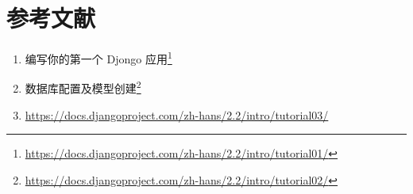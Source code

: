 \documentclass[]{ctexbook}
\providecommand{\tightlist}{%
  \setlength{\itemsep}{0pt}\setlength{\parskip}{0pt}}
\renewcommand{\href}[2]{#2\footnote{\url{#1}}}
\begin{document}
\hypertarget{ux53c2ux8003ux6587ux732e-1}{%
\section{参考文献}\label{ux53c2ux8003ux6587ux732e-1}}

\begin{enumerate}
\def\labelenumi{\arabic{enumi}.}
\tightlist
\item
  \href{https://docs.djangoproject.com/zh-hans/2.2/intro/tutorial01/}{编写你的第一个 Djongo 应用}
\item
  \href{https://docs.djangoproject.com/zh-hans/2.2/intro/tutorial02/}{数据库配置及模型创建}
\item
  \url{https://docs.djangoproject.com/zh-hans/2.2/intro/tutorial03/}
\end{enumerate}



\backmatter
\printindex
\end{document}
